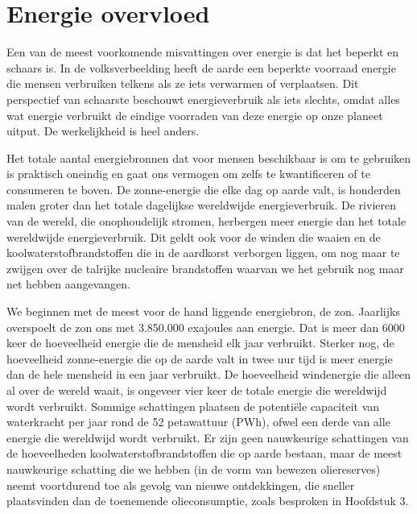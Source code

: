 \section[Energie overvloed]{Energie overvloed\autocite{94}}

Een van de meest voorkomende misvattingen over energie is dat het beperkt en schaars is. In de volksverbeelding heeft de aarde een beperkte voorraad energie die mensen verbruiken telkens als ze iets verwarmen of verplaatsen. Dit perspectief van schaarste beschouwt energieverbruik als iets slechts, omdat alles wat energie verbruikt de eindige voorraden van deze energie op onze planeet uitput. De werkelijkheid is heel anders.

Het totale aantal energiebronnen dat voor mensen beschikbaar is om te gebruiken is praktisch oneindig en gaat ons vermogen om zelfs te kwantificeren of te consumeren te boven. De zonne-energie die elke dag op aarde valt, is honderden malen groter dan het totale dagelijkse wereldwijde energieverbruik. De rivieren van de wereld, die onophoudelijk stromen, herbergen meer energie dan het totale wereldwijde energieverbruik. Dit geldt ook voor de winden die waaien en de koolwaterstofbrandstoffen die in de aardkorst verborgen liggen, om nog maar te zwijgen over de talrijke nucleaire brandstoffen waarvan we het gebruik nog maar net hebben aangevangen.

We beginnen met de meest voor de hand liggende energiebron, de zon. Jaarlijks overspoelt de zon ons met 3.850.000 exajoules aan energie. Dat is meer dan 6000 keer de hoeveelheid energie die de mensheid elk jaar verbruikt. Sterker nog, de hoeveelheid zonne-energie die op de aarde valt in twee uur tijd is meer energie dan de hele mensheid in een jaar verbruikt. De hoeveelheid windenergie die alleen al over de wereld waait, is ongeveer vier keer de totale energie die wereldwijd wordt verbruikt. Sommige schattingen plaatsen de potentiële capaciteit van waterkracht per jaar rond de 52 petawattuur (PWh), ofwel een derde van alle energie die wereldwijd wordt verbruikt. Er zijn geen nauwkeurige schattingen van de hoeveelheden koolwaterstofbrandstoffen die op aarde bestaan, maar de meest nauwkeurige schatting die we hebben (in de vorm van bewezen oliereserves) neemt voortdurend toe als gevolg van nieuwe ontdekkingen, die sneller plaatsvinden dan de toenemende olieconsumptie, zoals besproken in Hoofdstuk 3.

